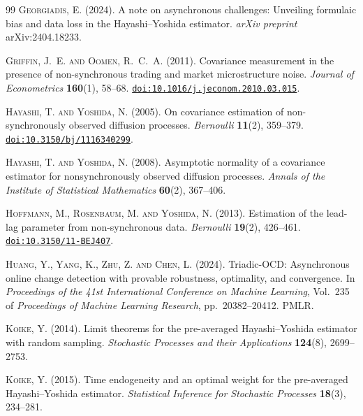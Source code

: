 \documentclass[reqno, 12pt]{amsart}
\newcommand{\doi}[1]{\href{https://doi.org/#1}{\texttt{doi:#1}}}
\theoremstyle{plain}
\theoremstyle{definition}
\theoremstyle{remark}
\begin{document}
\begin{thebibliography}{99}
\textsc{Georgiadis, E.} (2024).
A note on asynchronous challenges: Unveiling formulaic bias and data
loss in the {Hayashi--Yoshida} estimator.
\textit{arXiv preprint} arXiv:2404.18233.

\textsc{Griffin, J.~E. and Oomen, R.~C.~A.} (2011).
Covariance measurement in the presence of non-synchronous trading and
market microstructure noise.
\textit{Journal of Econometrics} \textbf{160}(1), 58--68.
\doi{10.1016/j.jeconom.2010.03.015}.

\textsc{Hayashi, T. and Yoshida, N.} (2005).
On covariance estimation of non-synchronously observed diffusion
processes.
\textit{Bernoulli} \textbf{11}(2), 359--379.
\doi{10.3150/bj/1116340299}.

\textsc{Hayashi, T. and Yoshida, N.} (2008).
Asymptotic normality of a covariance estimator for nonsynchronously
observed diffusion processes.
\textit{Annals of the Institute of Statistical Mathematics}
\textbf{60}(2), 367--406.

\textsc{Hoffmann, M., Rosenbaum, M. and Yoshida, N.} (2013).
Estimation of the lead-lag parameter from non-synchronous data.
\textit{Bernoulli} \textbf{19}(2), 426--461.
\doi{10.3150/11-BEJ407}.

\textsc{Huang, Y., Yang, K., Zhu, Z. and Chen, L.} (2024).
{Triadic-OCD}: Asynchronous online change detection with provable
robustness, optimality, and convergence.
In \textit{Proceedings of the 41st International Conference on Machine
Learning}, Vol.~235 of \textit{Proceedings of Machine Learning
Research}, pp.~20382--20412. PMLR.

\textsc{Koike, Y.} (2014).
Limit theorems for the pre-averaged {Hayashi--Yoshida} estimator with
random sampling.
\textit{Stochastic Processes and their Applications}
\textbf{124}(8), 2699--2753.

\textsc{Koike, Y.} (2015).
Time endogeneity and an optimal weight for the pre-averaged
{Hayashi--Yoshida} estimator.
\textit{Statistical Inference for Stochastic Processes}
\textbf{18}(3), 234--281.


\end{thebibliography}
\end{document}
